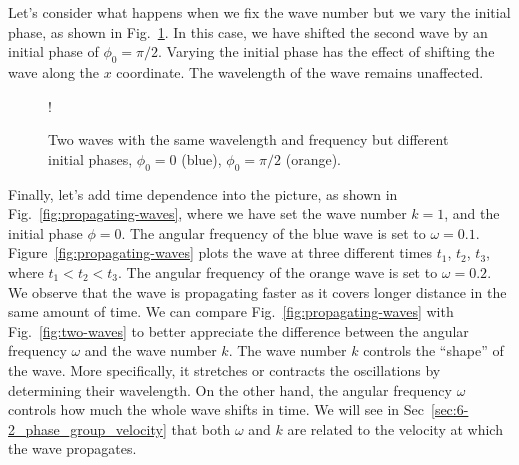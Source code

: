 Let's consider what happens when we fix the wave number but we vary the initial phase, as shown in Fig.~\ref{fig:phase-diff-waves}.
In this case, we have shifted the second wave by an initial phase of $\phi_0=\pi/2$.
Varying the initial phase has the effect of shifting the wave along the $x$ coordinate.
The wavelength of the wave remains unaffected.

\begin{figure}[t]
    \centering
    \resizebox {0.6\textwidth} {!} {
    }
    \caption[Same wavelength, different initial phase.]{Two waves with the same wavelength and frequency but different initial phases, $\phi_0 = 0$ (blue), $\phi_0=\pi/2$ (orange).}
    \label{fig:phase-diff-waves}
\end{figure}

Finally, let's add time dependence into the picture, as shown in Fig.~\ref{fig:propagating-waves}, where we have set the wave number $k=1$, and the initial phase $\phi=0$.
The angular frequency of the blue wave is set to $\omega=0.1$.
Figure~\ref{fig:propagating-waves} plots the wave at three different times $t_1$, $t_2$, $t_3$, where $t_1<t_2<t_3$.
The angular frequency of the orange wave is set to $\omega=0.2$.
We observe that the wave is propagating faster as it covers longer distance in the same amount of time.
We can compare Fig.~\ref{fig:propagating-waves} with Fig.~\ref{fig:two-waves} to better appreciate the difference between the angular frequency $\omega$ and the wave number $k$.
The wave number $k$ controls the ``shape'' of the wave.
More specifically, it stretches or contracts the oscillations by determining their wavelength.
On the other hand, the angular frequency $\omega$ controls how much the whole wave shifts in time.
We will see in Sec~\ref{sec:6-2_phase_group_velocity} that both $\omega$ and $k$ are related to the velocity at which the wave propagates.

